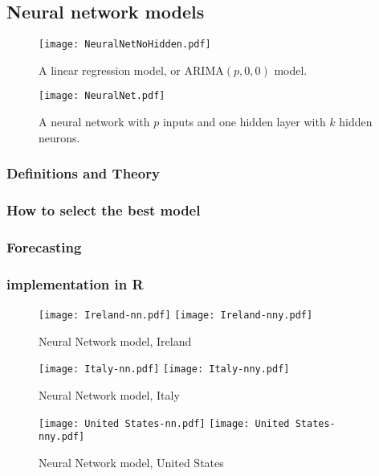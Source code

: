 \subsection{Neural network models}

\begin{figure}[H]
\texttt{[image: NeuralNetNoHidden.pdf]}
\caption{A linear regression model, or ARIMA$(p,0,0)$ model.}
\end{figure}

\begin{figure}[H]
\texttt{[image: NeuralNet.pdf]}
\caption{A neural network with $p$ inputs and one hidden layer with $k$ hidden neurons.}
\end{figure}

\subsubsection{Definitions and Theory}

\subsubsection{How to select the best model}

\subsubsection{Forecasting}

\subsubsection{implementation in R}

\begin{figure}[H]
  \texttt{[image: Ireland-nn.pdf]} \label{fig:ireland-nn}
\endminipage\hfill
{}
  \texttt{[image: Ireland-nny.pdf]} \label{fig:ireland-nny}
\endminipage
\caption{Neural Network model, Ireland}
\end{figure}

\begin{figure}[H]
  \texttt{[image: Italy-nn.pdf]} \label{fig:italy-nn}
\endminipage\hfill
{}
  \texttt{[image: Italy-nny.pdf]} \label{fig:italy-nny}
\endminipage
\caption{Neural Network model, Italy}
\end{figure}

\begin{figure}[H]
  \texttt{[image: United States-nn.pdf]} \label{fig:usa-nn}
\endminipage\hfill
{}
  \texttt{[image: United States-nny.pdf]} \label{fig:usa-nny}
\endminipage
\caption{Neural Network model, United States}
\end{figure}
